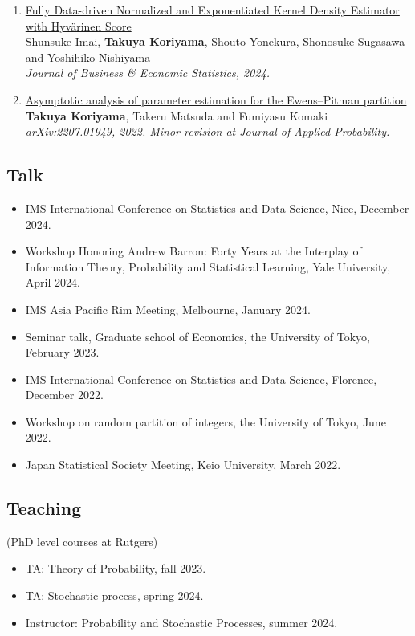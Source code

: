 \documentclass[10pt]{amsart}
\begin{document}
\begin{enumerate}
\item  \href{https://arxiv.org/abs/2212.00984}{Fully Data-driven Normalized and Exponentiated Kernel Density Estimator with Hyvärinen Score}\\
Shunsuke Imai, \textbf{Takuya Koriyama}, Shouto Yonekura, Shonosuke Sugasawa and Yoshihiko Nishiyama\\
\textit{Journal of Business \& Economic Statistics, 2024. }

\item \href{https://arxiv.org/abs/2207.01949}
{Asymptotic analysis of parameter estimation for the Ewens--Pitman partition}\\
\textbf{Takuya Koriyama}, Takeru Matsuda and Fumiyasu Komaki\\
\textit{arXiv:2207.01949, 2022. Minor revision at Journal of Applied Probability.}
\end{enumerate}

\subsection*{Talk}
\begin{itemize}
  \item  IMS International Conference on Statistics and Data Science, Nice, December 2024. 
  \item  Workshop Honoring Andrew Barron: Forty Years at the Interplay of Information Theory, Probability and Statistical Learning, Yale University, April 2024. 
  \item IMS Asia Pacific Rim Meeting, Melbourne, January 2024. 
  \item Seminar talk, Graduate school of Economics, the University of Tokyo, February 2023. 
  \item IMS International Conference on Statistics and Data Science, Florence, December 2022.
  \item  Workshop on random partition of integers, the University of Tokyo, June 2022.
  \item Japan Statistical Society Meeting, Keio University, March 2022.
\end{itemize}
\subsection*{Teaching} (PhD level courses at Rutgers)
\begin{itemize}
\item TA: Theory of Probability, fall 2023.
\item TA: Stochastic process, spring 2024.
\item Instructor: Probability and Stochastic Processes, summer 2024.
\end{itemize}
\end{document}
